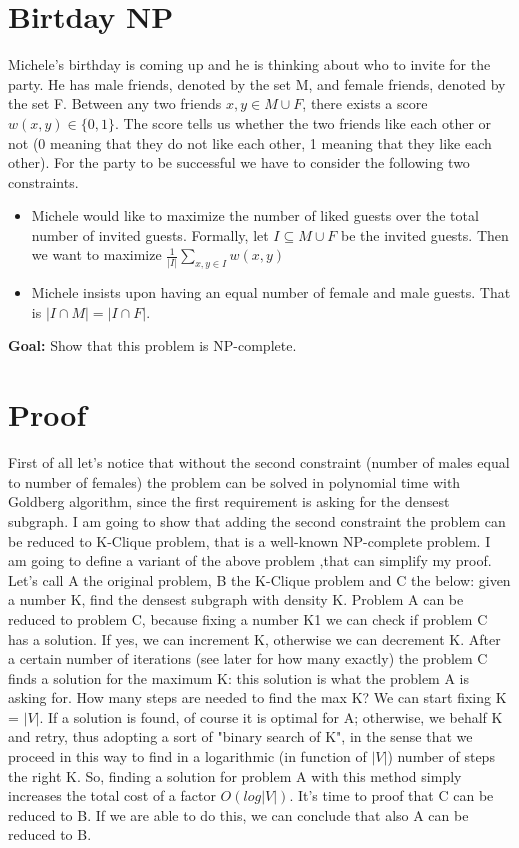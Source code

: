 \section{Birtday NP}
Michele's birthday is coming up and he is thinking about who to invite for the
party. He has male friends, denoted by the set M, and female friends, denoted by the set F.
Between any two friends $x, y \in M \cup F$, there exists a score $w(x, y) \in \{0, 1\}$. The score tells
us whether the two friends like each other or not (0 meaning that they do not like each other,
1 meaning that they like each other). For the party to be successful we have to consider the
following two constraints.
\begin{itemize}
	\item Michele would like to maximize the number of liked guests over the total number of
	invited guests. Formally, let $I \subseteq M \cup F$ be the invited guests. Then we want to maximize
	$\frac{1}{|I|} \sum_{x,y \in I} w(x,y)$
	\item Michele insists upon having an equal number of female and male guests. That is $|I \cap M| =
	|I \cap F|$.
\end{itemize}
\textbf{Goal:} Show that this problem is NP-complete.

\section{Proof}
First of all let's notice that without the second constraint (number of males equal to number of females) the problem can be solved in polynomial time with Goldberg algorithm, since the first requirement is asking for the densest subgraph. I am going to show that adding the second constraint the problem can be reduced to K-Clique problem, that is a well-known NP-complete problem. I am going to define a variant of the above problem ,that can simplify my proof. Let's call A the original problem, B the K-Clique problem and C the below: given a number K, find the densest subgraph with density K.
Problem A can be reduced to problem C, because fixing a number K1 we can check if problem C has a solution. If yes, we can increment K, otherwise we can decrement K. After a certain number of iterations (see later for how many exactly) the problem C finds a solution for the maximum K: this solution is what the problem A is asking for. How many steps are needed to find the max K? We can start fixing K = $|V|$. If a solution is found, of course it is optimal for A; otherwise, we behalf K and retry, thus adopting a sort of "binary search of K", in the sense that we proceed in this way to find in a logarithmic (in function of $|V|$) number of steps the right K. So, finding a solution for problem A with this method simply increases the total cost of a factor $O(log|V|)$. It's time to proof that C can be reduced to B. If we are able to do this, we can conclude that also A can be reduced to B.
